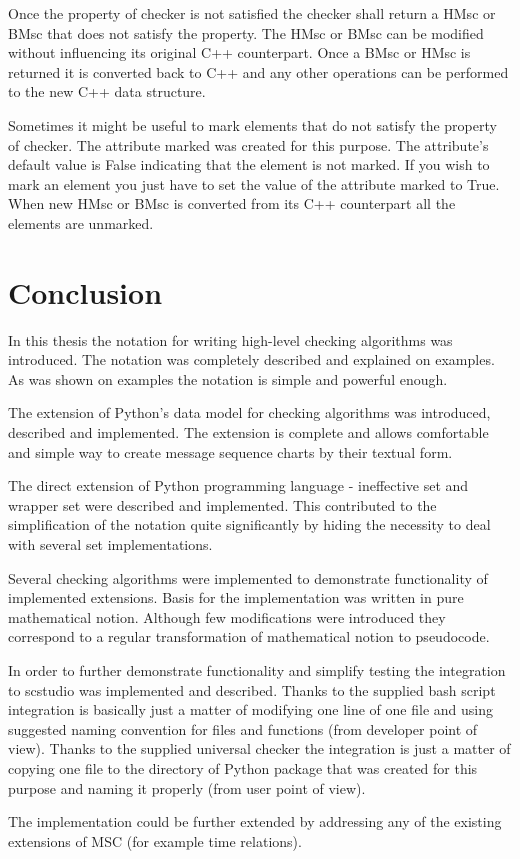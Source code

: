 \documentclass[11pt,oneside]{fithesis2}
\begin{document}
Once the property of checker is not satisfied the checker shall return a HMsc or BMsc that does not satisfy the property. The HMsc or BMsc can be modified without influencing its original C++ counterpart. Once a BMsc or HMsc is returned it is converted back to C++ and any other operations can be performed to the new C++ data structure.

Sometimes it might be useful to mark elements that do not satisfy the property of checker. The attribute marked was created for this purpose. The attribute's default value is False indicating that the element is not marked. If you wish to mark an element you just have to set the value of the attribute marked to True. When new HMsc or BMsc is converted from its C++ counterpart all the elements are unmarked.

\chapter{Conclusion}
In this thesis the notation for writing high-level checking algorithms was introduced. The notation was completely described and explained on examples. As was shown on examples the notation is simple and powerful enough.

The extension of Python's data model for checking algorithms was introduced, described and implemented. The extension is complete and allows comfortable and simple way to create message sequence charts by their textual form.

The direct extension of Python programming language - ineffective set and wrapper set were described and implemented. This contributed to the simplification of the notation quite significantly by hiding the necessity to deal with several set implementations.

Several checking algorithms were implemented to demonstrate functionality of implemented extensions. Basis for the implementation was written in pure mathematical notion. Although few modifications were introduced they correspond to a regular transformation of mathematical notion to pseudocode.

In order to further demonstrate functionality and simplify testing the integration to scstudio was implemented and described. Thanks to the supplied bash script integration is basically just a matter of modifying one line of one file and using suggested naming convention for files and functions (from developer point of view). Thanks to the supplied universal checker the integration is just a matter of copying one file to the directory of Python package that was created for this purpose and naming it properly (from user point of view).

The implementation could be further extended by addressing any of the existing extensions of MSC (for example time relations).

\printbibliography
 
\end{document}
